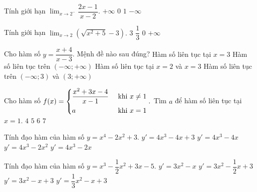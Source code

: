 \begin{ex}%
	Tính giới hạn $\displaystyle \lim_{x \to 2^-} \dfrac{2x-1}{x-2}.$
	\choice
	{$+\infty$}
	{$0$}
	{$1$}
	{\True $-\infty$}
\end{ex}

\begin{ex}%
	Tính giới hạn $\displaystyle \lim_{x \to 2} \left  (\sqrt{x^2+5}-3\right ).$
	\choice
	{$3$}
	{$\dfrac{1}{3}$}
	{\True $0$}
	{$+\infty$}
\end{ex}

\begin{ex}%
	Cho hàm số $y=\dfrac{x+4}{x-3}$. Mệnh đề nào sau đúng?
	\choice
	{Hàm số liên tục tại $x=3$}
	{Hàm số liên tục trên $(-\infty;+\infty)$}
	{Hàm số liên tục tại $x=2$ và $x=3$}
	{\True Hàm số liên tục trên $(-\infty;3)$ và $(3;+\infty)$}
\end{ex}

\begin{ex}%
	Cho hàm số $f(x) = \left\{\begin{aligned}&\dfrac{x^2+3x-4}{x-1} && \textrm{ khi } x \neq 1\\&a  && \textrm{ khi } x = 1\end{aligned}\right..$ Tìm $a$ để hàm số liên tục tại $x=1.$
	\choice
	{$4$}
	{\True $5$}
	{$6$}
	{$7$}
\end{ex}

\begin{ex}%
	Tính đạo hàm của hàm số $y=x^4-2x^2+3.$
	\choice
	{$y'=4x^3-4x+3$}
	{\True $y'=4x^3-4x$}
	{$y'=4x^3-2x^2$}
	{$y'=4x^3-2x$}
\end{ex}

\begin{ex}%
	Tính đạo hàm của hàm số $y=x^3-\dfrac{1}{2}x^2+3x-5.$
	\choice
	{$y'=3x^2-x$}
	{$y'=3x^2-\dfrac{1}{2}x+3$}
	{\True $y'=3x^2-x+3$}
	{$y'=\dfrac{1}{3}x^2-x+3$}
\end{ex}

